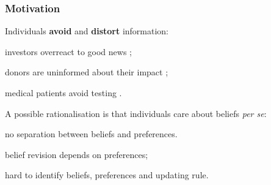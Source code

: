 \documentclass[usenames,dvipsnames,aspectratio=169,11pt, handout]{beamer}
\begin{document}
\begin{frame}
	\maketitle

\end{frame}

\begin{frame}\frametitle{Motivation}

	Individuals \textbf{avoid} and \textbf{distort} information:

	\vfill

	\begin{wideitemize}
		\item investors overreact to good news \citep{danielOverconfidentInvestorsPredictable2015};
		\item donors are uninformed about their impact \citep{niehausTheoryGoodIntentions2014};
		\item medical patients avoid testing \citep{golmanInformationAvoidance2017}.
	\end{wideitemize} \pause

	\vfill

	A possible rationalisation is that individuals care about beliefs \textit{per se}:

	\vfill

	\begin{wideitemize}
		\item no separation between beliefs and preferences.
		\item belief revision depends on preferences;
		\item hard to identify beliefs, preferences and updating rule.
	\end{wideitemize}

\end{frame}
\end{document}
